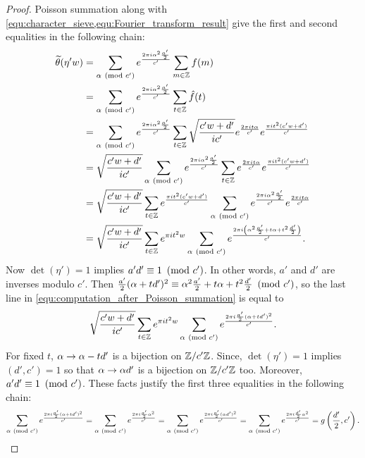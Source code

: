 \documentclass[12pt,reqno,oneside]{amsart}
\begin{document}
\begin{proof}
        Poisson summation along with \cref{equ:character_sieve,equ:Fourier_transform_result} give the first and second equalities in the following chain:
        \begin{equation}\label{equ:computation_after_Poisson_summation}
            \begin{aligned}
                \widetilde{\theta}(\eta' w) &= \sum_{\alpha \ \left(\text{mod }c'\right)}e^{\frac{2\pi i\alpha^{2}\frac{a'}{2}}{c'}}\sum_{m \in \mathbb{Z}}f(m) \\
                &= \sum_{\alpha \ \left(\text{mod }c'\right)}e^{\frac{2\pi i\alpha^{2}\frac{a'}{2}}{c'}}\sum_{t \in \mathbb{Z}}\hat{f}(t) \\
                &= \sum_{\alpha \ \left(\text{mod }c'\right)}e^{\frac{2\pi i\alpha^{2}\frac{a'}{2}}{c'}}\sum_{t \in \mathbb{Z}}\sqrt{\frac{c'w+d'}{ic'}}e^{\frac{2\pi i t\alpha}{c'}}e^{\frac{\pi it^{2}(c'w+d')}{c'}} \\
                &= \sqrt{\frac{c'w+d'}{ic'}}\sum_{\alpha \ \left(\text{mod }c'\right)}e^{\frac{2\pi i\alpha^{2}\frac{a'}{2}}{c'}}\sum_{t \in \mathbb{Z}}e^{\frac{2\pi i t\alpha}{c'}}e^{\frac{\pi it^{2}(c'w+d')}{c'}} \\
                &= \sqrt{\frac{c'w+d'}{ic'}}\sum_{t \in \mathbb{Z}}e^{\frac{\pi it^{2}(c'w+d')}{c'}}\sum_{\alpha \ \left(\text{mod }c'\right)}e^{\frac{2\pi i\alpha^{2}\frac{a'}{2}}{c'}}e^{\frac{2\pi i t\alpha}{c'}} \\
                &= \sqrt{\frac{c'w+d'}{ic'}}\sum_{t \in \mathbb{Z}}e^{\pi it^{2}w}\sum_{\alpha \ \left(\text{mod }c'\right)}e^{\frac{2\pi i\left(\alpha^{2}\frac{a'}{2}+t\alpha+t^{2}\frac{d'}{2}\right)}{c'}}.
            \end{aligned}
        \end{equation}
        Now $\det(\eta') = 1$ implies $a'd' \equiv 1 \ \left(\text{mod }c'\right)$. In other words, $a'$ and $d'$ are inverses modulo $c'$. Then $\frac{a'}{2}(\alpha+td')^{2} \equiv \alpha^{2}\frac{a'}{2}+t\alpha+t^{2}\frac{d'}{2} \ \left(\text{mod }c'\right)$, so the last line in \cref{equ:computation_after_Poisson_summation} is equal to
        \[
            \sqrt{\frac{c'w+d'}{ic'}}\sum_{t \in \mathbb{Z}}e^{\pi it^{2}w}\sum_{\alpha \ \left(\text{mod }c'\right)}e^{\frac{2\pi i\frac{a'}{2}(\alpha+td')^{2}}{c'}}.
        \]
        For fixed $t$, $\alpha \to \alpha-td'$ is a bijection on $\mathbb{Z}/c'\mathbb{Z}$. Since, $\det(\eta') = 1$ implies $(d',c') = 1$ so that $\alpha \to \alpha d'$ is a bijection on $\mathbb{Z}/c'\mathbb{Z}$ too. Moreover, $a'd' \equiv 1 \ \left(\text{mod }c'\right)$. These facts justify the first three equalities in the following chain:
        \begin{equation}\label{equ:simplification_1}
            \sum_{\a \tmod{c'}}e^{\frac{2\pi i\frac{a'}{2}(\a+td')^{2}}{c'}} = \sum_{\a \tmod{c'}}e^{\frac{2\pi i\frac{a'}{2}\a^{2}}{c'}} = \sum_{\a \tmod{c'}}e^{\frac{2\pi i\frac{a'}{2}(\a d')^{2}}{c'}} = \sum_{\a \tmod{c'}}e^{\frac{2\pi i\frac{d'}{2}\a^{2}}{c'}} = g\left(\frac{d'}{2},c'\right).

\end{equation}
\end{proof}
\end{document}
